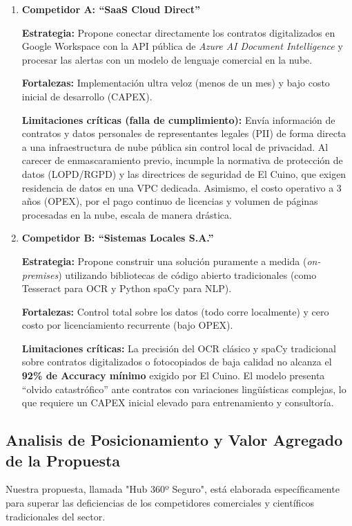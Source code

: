 \documentclass[12pt]{article}
\begin{document}
\begin{enumerate}
    \item \textbf{Competidor A: ``SaaS Cloud Direct''}

    \textbf{Estrategia:} Propone conectar directamente los contratos digitalizados en Google Workspace con la API pública de \textit{Azure AI Document Intelligence} y procesar las alertas con un modelo de lenguaje comercial en la nube.

    \textbf{Fortalezas:} Implementación ultra veloz (menos de un mes) y bajo costo inicial de desarrollo (CAPEX).

    \textbf{Limitaciones críticas (falla de cumplimiento):} Envía información de contratos y datos personales de representantes legales (PII) de forma directa a una infraestructura de nube pública sin control local de privacidad. Al carecer de enmascaramiento previo, incumple la normativa de protección de datos (LOPD/RGPD) y las directrices de seguridad de El Cuino, que exigen residencia de datos en una VPC dedicada. Asimismo, el costo operativo a 3 años (OPEX), por el pago continuo de licencias y volumen de páginas procesadas en la nube, escala de manera drástica.

    \item \textbf{Competidor B: ``Sistemas Locales S.A.''}

    \textbf{Estrategia:} Propone construir una solución puramente a medida (\textit{on-premises}) utilizando bibliotecas de código abierto tradicionales (como Tesseract para OCR y Python spaCy para NLP).

    \textbf{Fortalezas:} Control total sobre los datos (todo corre localmente) y cero costo por licenciamiento recurrente (bajo OPEX).

    \textbf{Limitaciones críticas:} La precisión del OCR clásico y spaCy tradicional sobre contratos digitalizados o fotocopiados de baja calidad no alcanza el \textbf{92\% de Accuracy mínimo} exigido por El Cuino. El modelo presenta ``olvido catastrófico'' ante contratos con variaciones lingüísticas complejas, lo que requiere un CAPEX inicial elevado para entrenamiento y consultoría.
\end{enumerate}

\subsection{Analisis de Posicionamiento y Valor Agregado de la Propuesta}

Nuestra propuesta, llamada "Hub 360º Seguro", está elaborada específicamente para superar las deficiencias de los competidores comerciales y científicos tradicionales del sector.
\end{document}
